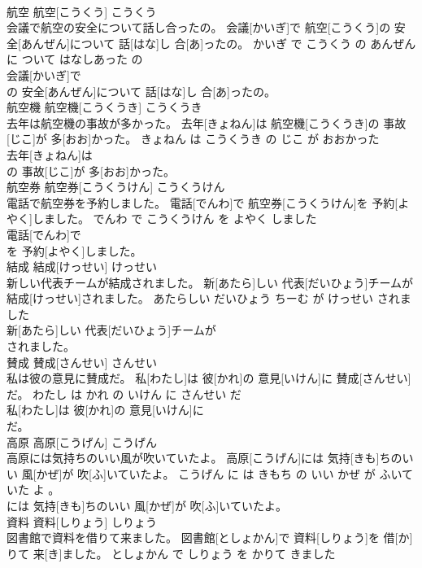 \documentclass[8pt]{extreport}
\begin{document}
\begin{CJK}{UTF8}{min}
\\	航空	航空[こうくう]	こうくう	
\\	会議で航空の安全について話し合ったの。	会議[かいぎ]で 航空[こうくう]の 安全[あんぜん]について 話[はな]し 合[あ]ったの。	かいぎ で こうくう の あんぜん に ついて はなしあった の	
\\	会議[かいぎ]で
\\	の 安全[あんぜん]について 話[はな]し 合[あ]ったの。			
\\	航空機	航空機[こうくうき]	こうくうき	
\\	去年は航空機の事故が多かった。	去年[きょねん]は 航空機[こうくうき]の 事故[じこ]が 多[おお]かった。	きょねん は こうくうき の じこ が おおかった	
\\	去年[きょねん]は
\\	の 事故[じこ]が 多[おお]かった。			
\\	航空券	航空券[こうくうけん]	こうくうけん	
\\	電話で航空券を予約しました。	電話[でんわ]で 航空券[こうくうけん]を 予約[よやく]しました。	でんわ で こうくうけん を よやく しました	
\\	電話[でんわ]で
\\	を 予約[よやく]しました。			
\\	結成	結成[けっせい]	けっせい	
\\	新しい代表チームが結成されました。	新[あたら]しい 代表[だいひょう]チームが 結成[けっせい]されました。	あたらしい だいひょう ちーむ が けっせい されました	
\\	新[あたら]しい 代表[だいひょう]チームが
\\	されました。			
\\	賛成	賛成[さんせい]	さんせい	
\\	私は彼の意見に賛成だ。	私[わたし]は 彼[かれ]の 意見[いけん]に 賛成[さんせい]だ。	わたし は かれ の いけん に さんせい だ	
\\	私[わたし]は 彼[かれ]の 意見[いけん]に
\\	だ。			
\\	高原	高原[こうげん]	こうげん	
\\	高原には気持ちのいい風が吹いていたよ。	高原[こうげん]には 気持[きも]ちのいい 風[かぜ]が 吹[ふ]いていたよ。	こうげん に は きもち の いい かぜ が ふいていた よ 。	
\\	には 気持[きも]ちのいい 風[かぜ]が 吹[ふ]いていたよ。			
\\	資料	資料[しりょう]	しりょう	
\\	図書館で資料を借りて来ました。	図書館[としょかん]で 資料[しりょう]を 借[か]りて 来[き]ました。	としょかん で しりょう を かりて きました	

\end{CJK}
\end{document}
